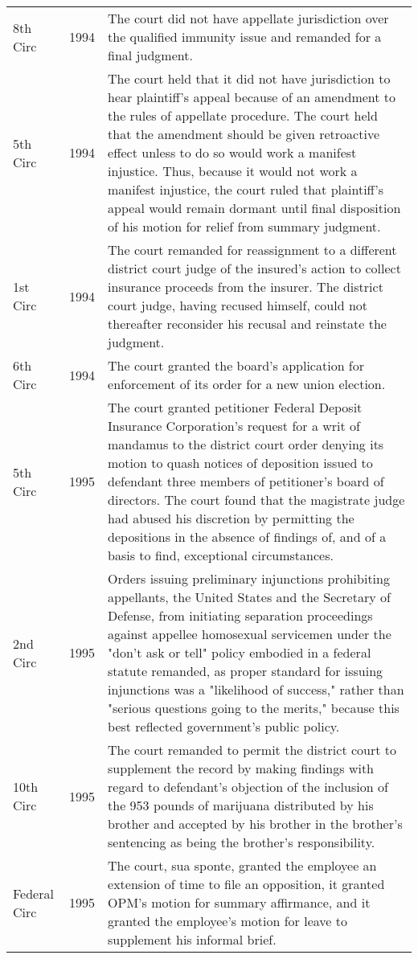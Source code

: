 \documentclass[10pt, letterpaper]{article}
\begin{document}
\begin{spacing}{1.0}
\begin{small}
\begin{longtable}[H]{llp{5in}}
    8th Circ & 1994 & The court did not have appellate jurisdiction over the qualified immunity issue and remanded for a final judgment.\\[4pt]
    5th Circ & 1994 & The court held that it did not have jurisdiction to hear plaintiff's appeal because of an amendment to the rules of appellate procedure. The court held that the amendment should be given retroactive effect unless to do so would work a manifest injustice. Thus, because it would not work a manifest injustice, the court ruled that plaintiff's appeal would remain dormant until final disposition of his motion for relief from summary judgment.\\[4pt]
    1st Circ & 1994 & The court remanded for reassignment to a different district court judge of the insured's action to collect insurance proceeds from the insurer. The district court judge, having recused himself, could not thereafter reconsider his recusal and reinstate the judgment.\\[4pt]
    6th Circ & 1994 & The court granted the board's application for enforcement of its order for a new union election.\\[4pt]
    5th Circ & 1995 & The court granted petitioner Federal Deposit Insurance Corporation's request for a writ of mandamus to the district court order denying its motion to quash notices of deposition issued to defendant three members of petitioner's board of directors. The court found that the magistrate judge had abused his discretion by permitting the depositions in the absence of findings of, and of a basis to find, exceptional circumstances.\\[4pt]
    2nd Circ & 1995 & Orders issuing preliminary injunctions prohibiting appellants, the United States and the Secretary of Defense, from initiating separation proceedings against appellee homosexual servicemen under the "don't ask or tell" policy embodied in a federal statute remanded, as proper standard for issuing injunctions was a "likelihood of success," rather than "serious questions going to the merits," because this best reflected government's public policy.\\[4pt]
    10th Circ & 1995 & The court remanded to permit the district court to supplement the record by making findings with regard to defendant's objection of the inclusion of the 953 pounds of marijuana distributed by his brother and accepted by his brother in the brother's sentencing as being the brother's responsibility.\\[4pt]
    Federal Circ & 1995 & The court, sua sponte, granted the employee an extension of time to file an opposition, it granted OPM's motion for summary affirmance, and it granted the employee's motion for leave to supplement his informal brief.\\[4pt]

\end{longtable}
\end{small}
\end{spacing}
\end{document}
